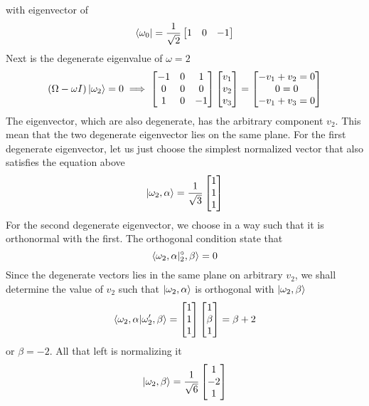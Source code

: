 \documentclass[../main.tex]{subfiles}
\begin{document}
with eigenvector of
\begin{equation*}
    \bra{\omega_0}=\frac{1}{\sqrt{2}}
    \begin{bmatrix}
        1&0&-1
    \end{bmatrix}
\end{equation*}
Next is the degenerate eigenvalue of $\omega=2$
\begin{equation*}
    (\Omega-\omega I)\ket{\omega_2}=0\implies
    \begin{bmatrix}
        -1&0&1\\
        0&0&0\\
        1&0&-1\\
    \end{bmatrix}
    \begin{bmatrix}
        v_1\\
        v_2\\
        v_3\\
    \end{bmatrix}
    =
    \begin{bmatrix}
        -v_1+v_2=0\\
        0=0\\
        -v_1+v_3=0\\
    \end{bmatrix}
\end{equation*}
The eigenvector, which are also degenerate, has the arbitrary component $v_2$.
This mean that the two degenerate eigenvector lies on the same plane.
For the first degenerate eigenvector, let us just choose the simplest normalized vector that also satisfies the equation above
\begin{equation*}
    \ket{\omega_2,\alpha}=\frac{1}{\sqrt{3}}
    \begin{bmatrix}
        1\\
        1\\
        1\\
    \end{bmatrix}
\end{equation*}
For the second degenerate eigenvector, we choose in a way such that it is orthonormal with the first.
The orthogonal condition state that 
\begin{equation*}
    \braket{\omega_2,\alpha|^\circ_2, \beta}=0
\end{equation*}
Since the degenerate vectors lies in the same plane on arbitrary $v_2$, we shall determine the value of $v_2$ such that $\ket{\omega_2,\alpha}$ is orthogonal with $\ket{\omega_2,\beta}$
\begin{equation*}
    \braket{\omega_2,\alpha|\omega_2', \beta}= 
    \begin{bmatrix}
        1\\1\\1
    \end{bmatrix}
    \begin{bmatrix}
        1\\
        \beta\\
        1\\
    \end{bmatrix}
    =\beta+2
\end{equation*}
or $\beta=-2$.
All that left is normalizing it 
\begin{equation*}
    \ket{\omega_2,\beta}=\frac{1}{\sqrt{6} }
    \begin{bmatrix}
        1\\
        -2\\
        1
    \end{bmatrix}
\end{equation*}
\end{document}
